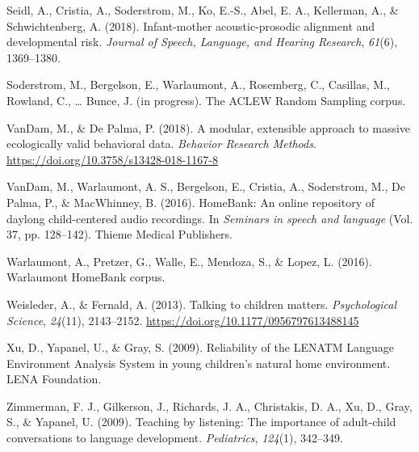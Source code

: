 \documentclass[english,table,man,floatsintext]{apa6}
\begin{document}
\hypertarget{ref-Seidl2018}{}
Seidl, A., Cristia, A., Soderstrom, M., Ko, E.-S., Abel, E. A.,
Kellerman, A., \& Schwichtenberg, A. (2018). Infant-mother
acoustic-prosodic alignment and developmental risk. \emph{Journal of
Speech, Language, and Hearing Research}, \emph{61}(6), 1369--1380.

\hypertarget{ref-soderstrom}{}
Soderstrom, M., Bergelson, E., Warlaumont, A., Rosemberg, C., Casillas,
M., Rowland, C., \ldots{} Bunce, J. (in progress). The ACLEW Random
Sampling corpus.

\hypertarget{ref-VanDam2018}{}
VanDam, M., \& De Palma, P. (2018). A modular, extensible approach to
massive ecologically valid behavioral data. \emph{Behavior Research
Methods}. \url{https://doi.org/10.3758/s13428-018-1167-8}

\hypertarget{ref-vandam2016homebank}{}
VanDam, M., Warlaumont, A. S., Bergelson, E., Cristia, A., Soderstrom,
M., De Palma, P., \& MacWhinney, B. (2016). HomeBank: An online
repository of daylong child-centered audio recordings. In \emph{Seminars
in speech and language} (Vol. 37, pp. 128--142). Thieme Medical
Publishers.

\hypertarget{ref-warlaumont2016warlaumont}{}
Warlaumont, A., Pretzer, G., Walle, E., Mendoza, S., \& Lopez, L.
(2016). Warlaumont HomeBank corpus.

\hypertarget{ref-Weisleder2013a}{}
Weisleder, A., \& Fernald, A. (2013). Talking to children matters.
\emph{Psychological Science}, \emph{24}(11), 2143--2152.
\url{https://doi.org/10.1177/0956797613488145}

\hypertarget{ref-Xu2009a}{}
Xu, D., Yapanel, U., \& Gray, S. (2009). Reliability of the LENATM
Language Environment Analysis System in young children's natural home
environment. LENA Foundation.

\hypertarget{ref-zimmerman2009}{}
Zimmerman, F. J., Gilkerson, J., Richards, J. A., Christakis, D. A., Xu,
D., Gray, S., \& Yapanel, U. (2009). Teaching by listening: The
importance of adult-child conversations to language development.
\emph{Pediatrics}, \emph{124}(1), 342--349.
\end{document}
